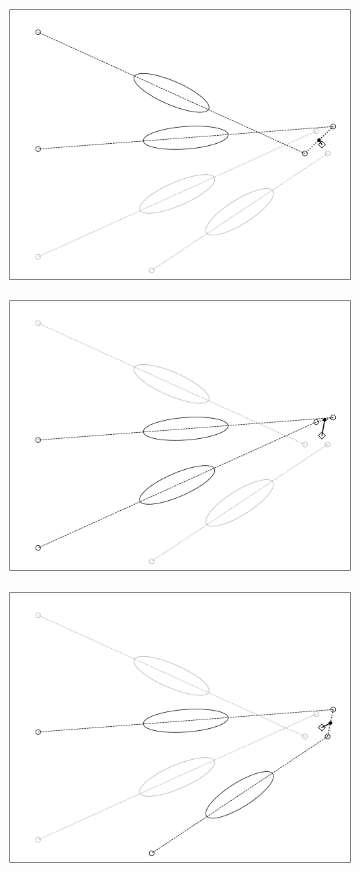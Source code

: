 \begin{figure}
    \begin{subfigure}{0.3\textwidth}
        \includegraphics[width=0.9\linewidth]{../Plots/stereo_magic_1.pdf} 
    \end{subfigure}
    \begin{subfigure}{0.3\textwidth}
        \includegraphics[width=0.9\linewidth]{../Plots/stereo_magic_2.pdf}
    \end{subfigure}
    \begin{subfigure}{0.3\textwidth}
        \includegraphics[width=0.9\linewidth]{../Plots/stereo_magic_3.pdf} 

\end{subfigure}
\end{figure}
